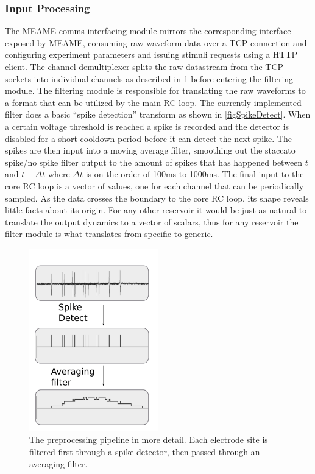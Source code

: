 \subsubsection{Input Processing}
The MEAME comms interfacing module mirrors the corresponding interface exposed
by MEAME, consuming raw waveform data over a TCP connection and configuring
experiment parameters and issuing stimuli requests using a HTTP client.
The channel demultiplexer splits the raw datastream from the TCP sockets into
individual channels as described in \ref{figWaves} before entering the filtering
module.
The filtering module is responsible for translating the raw waveforms to a
format that can be utilized by the main RC loop.
The currently implemented filter does a basic ``spike detection'' transform
as shown in \ref{figSpikeDetect}.
When a certain voltage threshold is reached a spike is recorded and the detector
is disabled for a short cooldown period before it can detect the next spike.
The spikes are then input into a moving average filter, smoothing out the
staccato spike/no spike filter output to the amount of spikes that has happened
between $t$ and $t - \Delta t$ where $\Delta t$ is on the order of 100ms to 1000ms.
The final input to the core RC loop is a vector of values, one for each channel
that can be periodically sampled.
As the data crosses the boundary to the core RC loop, its shape reveals little
facts about its origin.
For any other reservoir it would be just as natural to translate the output
dynamics to a vector of scalars, thus for any reservoir the filter module is
what translates from specific to generic.
\begin{figure}[h!]
  \centering
  \includegraphics[width=0.5\textwidth]{fig/Transforms.png}
  \caption{
    The preprocessing pipeline in more detail.
    Each electrode site is filtered first through a spike detector, then passed
    through an averaging filter.
  }
  \label{figWaves}
\end{figure}
